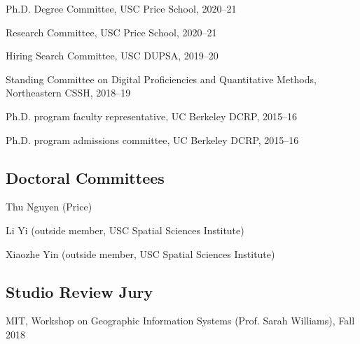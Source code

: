 \documentclass[12pt,letterpaper]{report}
\newcommand{\listitemspace}{0.25em}
\renewenvironment{itemize}
{\begin{list}{}{\setlength{\leftmargin}{0em}
            \setlength{\parskip}{0em}
            \setlength{\itemsep}{\listitemspace}
            \setlength{\parsep}{\listitemspace}}}
{\end{list}}
\begin{document}
    \begin{itemize}

        \item Ph.D. Degree Committee, USC Price School, 2020--21

        \item Research Committee, USC Price School, 2020--21

        \item Hiring Search Committee, USC DUPSA, 2019--20

        \item Standing Committee on Digital Proficiencies and Quantitative Methods, Northeastern CSSH, 2018--19

        \item Ph.D. program faculty representative, UC Berkeley DCRP, 2015--16

        \item Ph.D. program admissions committee, UC Berkeley DCRP, 2015--16

    \end{itemize}

    \subsection*{Doctoral Committees}

    \begin{itemize}

        \item Thu Nguyen (Price)

        \item Li Yi (outside member, USC Spatial Sciences Institute)

        \item Xiaozhe Yin (outside member, USC Spatial Sciences Institute)

    \end{itemize}

    \subsection*{Studio Review Jury}

    \begin{itemize}

        \item MIT, Workshop on Geographic Information Systems (Prof. Sarah Williams), Fall 2018

    \end{itemize}
\end{document}
